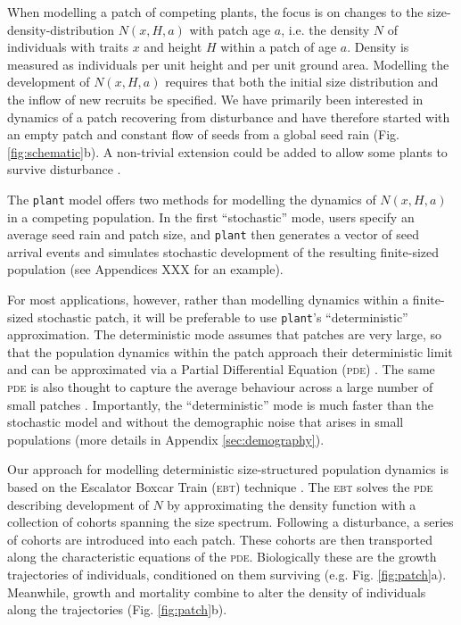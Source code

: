 \documentclass[a4paper,11pt]{article}
\newcommand{\plant}{\texttt{plant}}
\begin{document}
When modelling a patch of competing plants, the focus is on changes to the size-
density-distribution \(N(x, H, a)\) with patch age \(a\), i.e. the density \(N\) of
individuals with traits \(x\) and height \(H\) within a patch of age \(a\).
Density is measured as individuals per unit height and per unit ground area.
Modelling the development of  \(N(x, H, a)\) requires that both the initial size
distribution and the inflow of new recruits be specified. We have primarily
been interested in dynamics of a patch recovering from disturbance and have
therefore started with an empty patch and constant flow of seeds from a global
seed rain (Fig. \ref{fig:schematic}b). A non-trivial extension could be added to allow some plants to survive disturbance \citep[following][]{Kohyama-1993}.

The {\plant} model offers two methods for modelling the dynamics of \(N(x,
H, a)\) in a competing population. In the first ``stochastic'' mode, users
specify an average seed rain and patch size, and {\plant} then generates a
vector of seed arrival events and simulates stochastic
development of the resulting finite-sized population (see Appendices XXX for an
example).

For most applications, however, rather than modelling
dynamics within a finite-sized stochastic patch, it will be preferable to use {\plant}'s
``deterministic'' approximation. The deterministic mode assumes that
patches are very large, so that the population dynamics within the
patch approach their deterministic limit and can
be approximated via a Partial Differential Equation (\textsc{pde})
\citep{Deroos-1997, Kohyama-1993}.  The same \textsc{pde} is also thought to
capture the average behaviour across a large number of small patches
\citep{Moorcroft-2001}. Importantly, the ``deterministic'' mode is
much faster than the stochastic model and without the demographic noise
that arises in small populations (more details in Appendix \ref{sec:demography}).

Our approach for modelling deterministic size-structured population dynamics is
based on the Escalator Boxcar Train (\textsc{ebt}) technique
\citep{Deroos-1988, Deroos-1992, Deroos-1997, Brannstrom-2013}. The \textsc{ebt} solves
the \textsc{pde} describing development of \(N\) by approximating the
density function with a collection of cohorts spanning the size
spectrum. Following a disturbance, a series of cohorts are introduced
into each patch. These cohorts are then transported along the
characteristic equations of the \textsc{pde}. Biologically these are
the growth trajectories of individuals, conditioned on them surviving
(e.g. Fig. \ref{fig:patch}a). Meanwhile, growth and mortality combine
to alter the density of individuals along the trajectories
(Fig. \ref{fig:patch}b).
\end{document}
